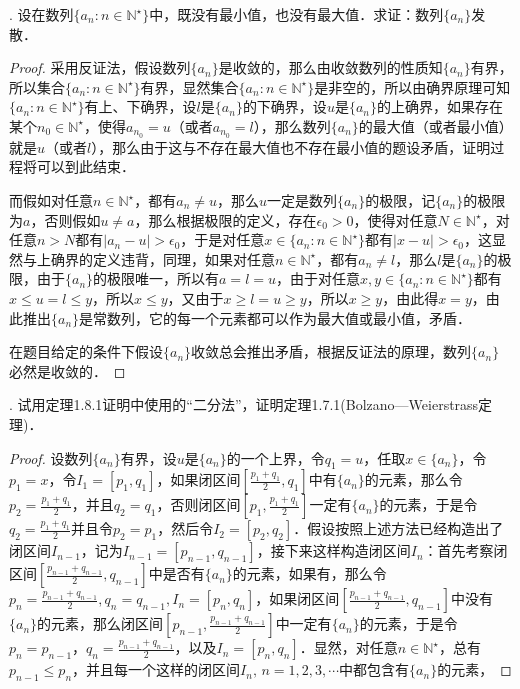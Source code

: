 \documentclass{ctexart}
\theoremstyle{definition}
\theoremstyle{definition}
\theoremstyle{plain}
\theoremstyle{plain}
\theoremstyle{plain}
\theoremstyle{definition}
\begin{document}
. 设在数列$\{ a_n:n\in\mathbb{N}^\star\}$中，既没有最小值，也没有最大值．求证：数列$\{a_n\}$发散．
\begin{proof}
采用反证法，假设数列$\{a_n\}$是收敛的，那么由收敛数列的性质知$\{a_n\}$有界，所以集合$\{a_n:n\in\mathbb{N}^\star\}$有界，显然集合$\{a_n:n\in\mathbb{N}^\star\}$是非空的，所以由确界原理可知$\{a_n:n\in\mathbb{N}^\star\}$有上、下确界，设$l$是$\{a_n\}$的下确界，设$u$是$\{a_n\}$的上确界，如果存在某个$n_0 \in \mathbb{N}^\star$，使得$a_{n_0}=u$（或者$a_{n_0}=l$），那么数列$\{a_n\}$的最大值（或者最小值）就是$u$（或者$l$），那么由于这与不存在最大值也不存在最小值的题设矛盾，证明过程将可以到此结束．

\noindent 而假如对任意$n\in\mathbb{N}^\star$，都有$a_n \neq u$，那么$u$一定是数列$\{a_n\}$的极限，记$\{a_n\}$的极限为$a$，否则假如$u \neq a$，那么根据极限的定义，存在$\epsilon_0 > 0$，使得对任意$N \in \mathbb{N}^\star$，对任意$n > N$都有$|a_n - u| > \epsilon_0$，于是对任意$x \in \{a_n:n\in\mathbb{N}^\star\}$都有$|x-u|>\epsilon_0$，这显然与上确界的定义违背，同理，如果对任意$n\in\mathbb{N}^\star$，都有$a_n \neq l$，那么$l$是$\{a_n\}$的极限，由于$\{a_n\}$的极限唯一，所以有$a=l=u$，由于对任意$x,y \in \{a_n:n\in\mathbb{N}^\star\}$都有$x \leq u = l \leq y$，所以$x \leq y$，又由于$x \geq l = u \geq y$，所以$x \geq y$，由此得$x=y$，由此推出$\{a_n\}$是常数列，它的每一个元素都可以作为最大值或最小值，矛盾．

\noindent 在题目给定的条件下假设$\{a_n\}$收敛总会推出矛盾，根据反证法的原理，数列$\{a_n\}$必然是收敛的．
\end{proof}

. 试用定理1.8.1证明中使用的``二分法''，证明定理1.7.1(Bolzano---Weierstrass定理)．
\begin{proof}
设数列$\{a_n\}$有界，设$u$是$\{a_n\}$的一个上界，令$q_1 = u$，任取$ x \in \{a_n\}$，令$p_1 = x$，令$I_1 = [p_1, q_1]$，如果闭区间$[\displaystyle\frac{p_1+q_1}{2}, q_1]$中有$\{a_n\}$的元素，那么令$p_2 = \displaystyle \frac{p_1+q_1}{2}$，并且$q_2 = q_1$，否则闭区间$[p_1, \displaystyle\frac{p_1+q_1}{2}]$一定有$\{a_n\}$的元素，于是令$q_2 = \displaystyle \frac{p_1+q_1}{2}$并且令$p_2 = p_1$，然后令$I_2 = [p_2, q_2]$．假设按照上述方法已经构造出了闭区间$I_{n-1}$，记为$I_{n-1} = [p_{n-1}, q_{n-1}]$，接下来这样构造闭区间$I_n$：首先考察闭区间$[\displaystyle\frac{p_{n-1}+q_{n-1}}{2}, q_{n-1}]$中是否有$\{a_n\}$的元素，如果有，那么令$p_n = \displaystyle\frac{p_{n-1}+q_{n-1}}{2}, q_n = q_{n-1}, I_n = [p_n, q_n]$，如果闭区间$[\displaystyle\frac{p_{n-1}+q_{n-1}}{2},q_{n-1}]$中没有$\{a_n\}$的元素，那么闭区间$[p_{n-1},\displaystyle\frac{p_{n-1}+q_{n-1}}{2}]$中一定有$\{a_n\}$的元素，于是令$p_n = p_{n-1}$，$q_n = \displaystyle\frac{p_{n-1}+q_{n-1}}{2}$，以及$I_n = [p_n, q_n]$．显然，对任意$n \in \mathbb{N}^\star$，总有$p_{n-1} \leq p_n$，并且每一个这样的闭区间$I_n, \, n=1,2,3,\cdots$中都包含有$\{a_n\}$的元素，
\end{proof}
\end{document}
